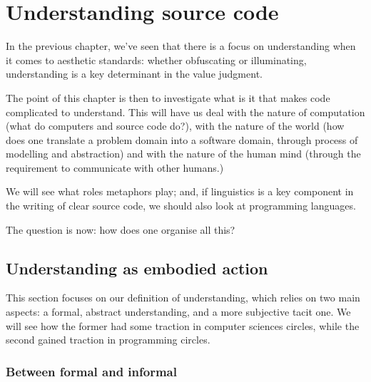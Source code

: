 \chapter{Understanding source code}

In the previous chapter, we've seen that there is a focus on understanding when it comes to aesthetic standards: whether obfuscating or illuminating, understanding is a key determinant in the value judgment.

The point of this chapter is then to investigate what is it that makes code complicated to understand. This will have us deal with the nature of computation (what do computers and source code do?), with the nature of the world (how does one translate a problem domain into a software domain, through process of modelling and abstraction) and with the nature of the human mind (through the requirement to communicate with other humans.)

We will see what roles metaphors play; and, if linguistics is a key component in the writing of clear source code, we should also look at programming languages.


The question is now: how does one organise all this?

\section{Understanding as embodied action}

This section focuses on our definition of understanding, which relies on two main aspects: a formal, abstract understanding, and a more subjective tacit one. We will see how the former had some traction in computer sciences circles, while the second gained traction in programming circles.

\subsection{Between formal and informal}




